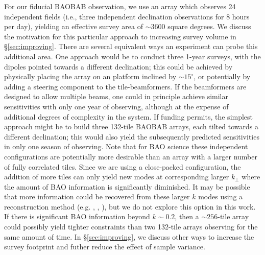 \documentclass[10pt,iop]{emulateapj}
\begin{document}
For our fiducial BAOBAB observation, we use an array which observes 24 independent fields
(i.e., three independent declination observations for 8 hours per day), yielding an
effective survey area of $\sim 3600$ square degrees.  
We discuss the motivation for this particular approach to increasing survey volume in
\S\ref{sec:improving}.
There are several equivalent ways an 
experiment can probe this additional area.  One approach would be to conduct three 1-year surveys,
with the dipoles pointed towards a different declination; this could be achieved by physically
placing the array on an platform inclined by $\sim 15^{\circ}$, or potentially by adding a steering
component to the tile-beamformers.  If the beamformers are designed to allow multiple beams, one
could in principle achieve similar sensitivities with only one year of observing, although
at the expense of additional degrees of complexity in the system.  If funding permits, the 
simplest approach might be to build three 132-tile BAOBAB arrays, each tilted towards a different
declination; this would also yield the subsequently predicted sensitivities in only one season of
observing.  Note that for BAO science these independent configurations are
potentially more desirable than
an array with a larger number of fully correlated tiles.  Since we are using a close-packed
configuration, the addition of more tiles can only yield new modes at corresponding larger $k_{\perp}$ 
where the amount of BAO information is significantly diminished.  It may be possible
that more information could be recovered from these larger $k$ modes using a reconstruction
method (e.g. \citealt{eisenstein_et_al_2007}, \citealt{padmanabhan_et_al_2009},
\citealt{noh_et_al_2009}), but we do not explore this option in this work.  
If there is significant BAO information beyond $k \sim 0.2$, then a $\sim 256$-tile array could
possibly yield tighter constraints than two 132-tile arrays observing for the same
amount of time.
In \S\ref{sec:improving},
we discuss other ways to increase the survey footprint and futher reduce the effect of sample
variance.
\end{document}
